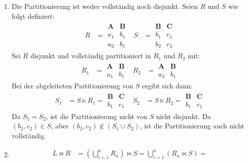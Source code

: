 \documentclass[11pt,a4paper]{scrartcl}
\begin{document}
\begin{enumerate}
\item Die Partitionierung ist weder vollständig noch disjunkt.  Seien $R$ und
  $S$ wie folgt definiert:
  \begin{align*}
    R &=
    \begin{array}{c|c}
      \mathbf{A} & \mathbf{B} \\\hline
      a_1 & b_1 \\
      a_2 & b_1
    \end{array} & S &=
    \begin{array}{c|c}
      \mathbf{B} & \mathbf{C} \\\hline
      b_1 & c_1 \\
      b_2 & c_2
    \end{array}
  \end{align*}
  Sei $R$ disjunkt und vollständig partitioniert in $R_1$ und $R_2$ mit:
  \begin{align*}
    R_1 &=
    \begin{array}{c|c}
      \mathbf{A} & \mathbf{B} \\\hline
      a_1 & b_1
    \end{array}
    & R_2 &=
    \begin{array}{c|c}
      \mathbf{A} & \mathbf{B} \\\hline
      a_2 & b_1
    \end{array}
  \end{align*}
  Bei der abgeleiteten Partitionierung von $S$ ergibt sich dann:
  \begin{align*}
    S_1 &= S \ltimes R_1 =
    \begin{array}{c|c}
      \mathbf{B} & \mathbf{C} \\\hline
      b_1 & c_1
    \end{array} & S_2 &= S \ltimes R_2 =
    \begin{array}{c|c}
      \mathbf{B} & \mathbf{C} \\\hline
      b_1 & c_1
    \end{array}
  \end{align*}
Da $S_1 = S_2$, ist die Partitionierung nicht von $S$ nicht disjunkt.  Da
$(b_2, c_2) \in S$, aber $(b_2, c_2) \notin (S_1 \cup S_2)$, ist die
Partitionierung auch nicht vollständig.
\item
  \begin{align*}
    L \bowtie R &= \left(\bigcup_{i=1}^n R_n\right) \bowtie S =
    \bigcup_{i=1}^n\left(R_n \bowtie S\right) = \\

\end{align*}
\end{enumerate}
\end{document}
